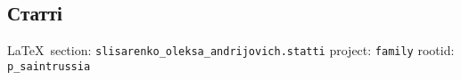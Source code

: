  
 
\subsection{Статті}

\vspace{0.5cm}
 {\ifDEBUG\small\LaTeX~section: \verb|slisarenko_oleksa_andrijovich.statti| project: \verb|family| rootid: \verb|p_saintrussia| \fi}
\vspace{0.5cm}


